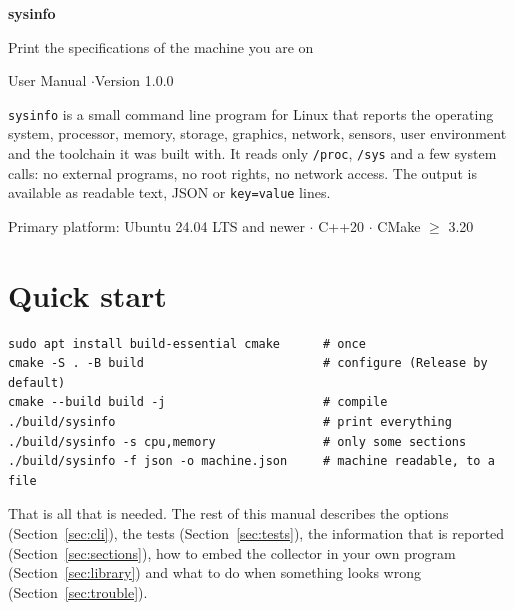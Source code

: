 \documentclass[11pt,a4paper]{article}
\newcommand{\cmd}[1]{\texttt{#1}}
\newcommand{\prog}{\texttt{sysinfo}}
\begin{document}
\begin{titlepage}
\vspace*{3.5cm}
{\Huge\bfseries\color{accent} sysinfo}\par
\vspace{4pt}
{\Large Print the specifications of the machine you are on}\par
\vspace{1.2cm}
{\large User Manual \quad$\cdot$\quad Version 1.0.0}\par
\vspace{2cm}
\begin{minipage}{0.8\textwidth}
\prog{} is a small command line program for Linux that reports the operating system, processor,
memory, storage, graphics, network, sensors, user environment and the toolchain it was built with.
It reads only \cmd{/proc}, \cmd{/sys} and a few system calls: no external programs, no root rights, no
network access. The output is available as readable text, JSON or \texttt{key=value} lines.
\end{minipage}
\vfill
{\small Primary platform: Ubuntu 24.04 LTS and newer \quad $\cdot$ \quad C++20 \quad $\cdot$ \quad CMake $\geq$ 3.20}
\end{titlepage}

\tableofcontents
\newpage

\section{Quick start}

\begin{lstlisting}
sudo apt install build-essential cmake      # once
cmake -S . -B build                         # configure (Release by default)
cmake --build build -j                      # compile
./build/sysinfo                             # print everything
./build/sysinfo -s cpu,memory               # only some sections
./build/sysinfo -f json -o machine.json     # machine readable, to a file
\end{lstlisting}

That is all that is needed. The rest of this manual describes the options (Section~\ref{sec:cli}), the tests (Section~\ref{sec:tests}), the
information that is reported (Section~\ref{sec:sections}), how to embed the collector in your own
program (Section~\ref{sec:library}) and what to do when something looks wrong
(Section~\ref{sec:trouble}).
\end{document}
